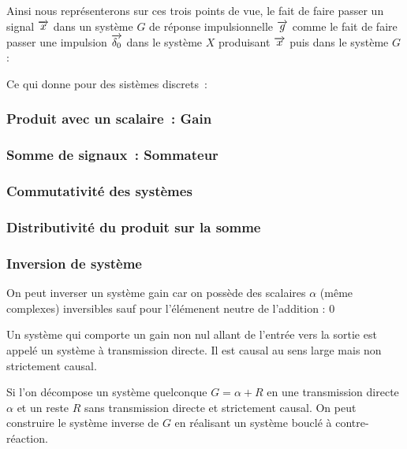 Ainsi nous représenterons sur ces trois points de vue, le fait de
faire passer un signal $\overrightarrow{x}$ dans un système $G$ de réponse
impulsionnelle $\overrightarrow{g}$ comme le fait de faire passer une impulsion $\d0$
dans le système $X$ produisant $\overrightarrow{x}$ puis dans le système $G$ :


Ce qui donne pour des sistèmes discrets~:


\subsubsection{Produit avec un scalaire~: Gain}

\subsubsection{Somme de signaux~: Sommateur}

\subsubsection{Commutativité des systèmes}


\subsubsection{Distributivité du produit sur la somme}


\subsubsection{Inversion de système}

On peut inverser un système gain car on possède des scalaires $\alpha$
(même complexes) inversibles sauf pour l'élémenent neutre de
l'addition : $0$

Un système qui comporte un gain non nul allant de l'entrée vers la
sortie est appelé un système à transmission directe. Il est causal au
sens large mais non strictement causal.


Si l'on décompose un système quelconque $G=\alpha+R$ en une
transmission directe $\alpha$ et un reste $R$ sans transmission
directe et strictement causal. On peut construire le système inverse
de $G$ en réalisant un système bouclé à contre-réaction.


